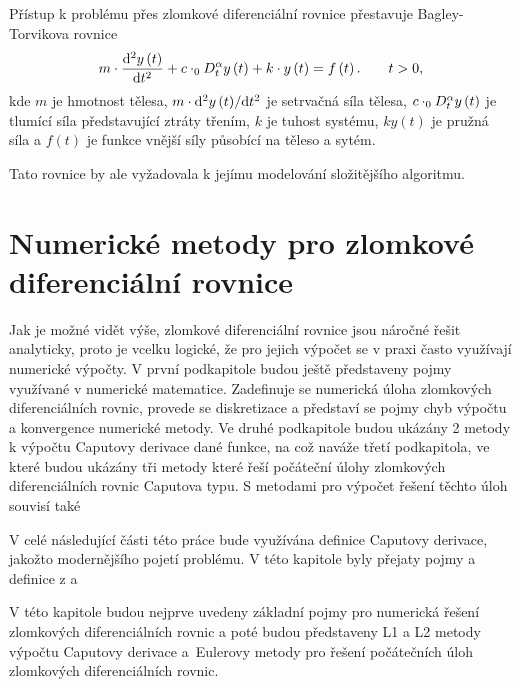 \documentclass[a4paper,12pt,twoside]{article}
\theoremstyle{definition}
\theoremstyle{remark}
\numberwithin{equation}{section}
\numberwithin{table}{section}
\numberwithin{figure}{section}
\newcommand{\dx}[1]{\mathrm{d} #1}
\begin{document}
Přístup k problému přes zlomkové diferenciální rovnice přestavuje Bagley-Torvikova rovnice
\begin{equation}
	m\cdot \frac{\dx ^{2} y\left(t\right)}{\dx t^{2}} + c\cdot _{0}D^{\alpha}_{t} y\left(t\right) +k \cdot y\left(t\right) = f\left(t\right). \qquad t > 0,
\end{equation}
kde $m$ je hmotnost tělesa, $m\cdot {\dx ^{2} y\left(t\right)}/{\dx t^{2}}$ je setrvačná síla tělesa, $c\cdot \space _{0}D^{\alpha}_{t} y\left(t\right)$ je tlumící síla představující ztráty třením, $k$ je tuhost systému, $ky\left(t\right)$ je pružná síla a $f\left(t\right)$ je funkce vnější síly působící na těleso a sytém. \cite{ChenInMechanics}

Tato rovnice by ale vyžadovala k jejímu modelování složitějšího algoritmu.

\section{Numerické metody pro zlomkové diferenciální rovnice}
Jak je možné vidět výše, zlomkové diferenciální rovnice jsou náročné řešit analyticky, proto je vcelku logické, že pro jejich výpočet se v praxi často využívají numerické výpočty. 
V první podkapitole budou ještě představeny pojmy využívané v numerické matematice. Zadefinuje se numerická úloha zlomkových diferenciálních rovnic, provede se diskretizace a představí se pojmy chyb výpočtu a konvergence numerické metody.
Ve druhé podkapitole budou ukázány 2 metody k výpočtu Caputovy derivace dané funkce, na což naváže třetí podkapitola, ve které budou ukázány tři metody které řeší počáteční úlohy zlomkových diferenciálních rovnic Caputova typu. S metodami pro výpočet řešení těchto úloh souvisí také %

V celé následující části této práce bude využívána definice Caputovy derivace, jakožto modernějšího pojetí problému. V této kapitole byly přejaty pojmy a definice z \cite{NumMetody} a \cite{Cangpin}

V této kapitole budou nejprve uvedeny základní pojmy pro numerická řešení zlomkových diferenciálních rovnic a poté budou  představeny L1 a L2 metody výpočtu Caputovy derivace a~Eulerovy metody pro řešení počátečních úloh zlomkových diferenciálních rovnic.
\end{document}
